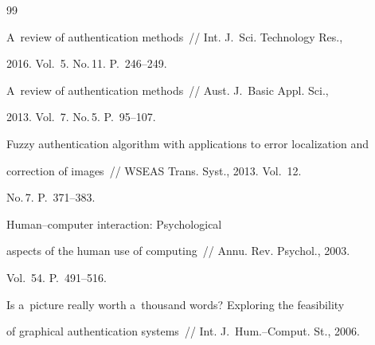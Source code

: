 {\small\frenchspacing


{%




\begin{thebibliography}{99}






 A~review of authentication methods~/\!\!/ Int. J.~Sci. Technology Res., 


 2016. Vol.~5. No.\,11. P.~246--249.









A~review of authentication methods~/\!\!/ {Aust. J.~Basic Appl. Sci.}, 


2013. Vol.~7. No.\,5. P.~95--107.









Fuzzy authentication algorithm with applications to error localization and 


correction of images~/\!\!/ {WSEAS Trans. Syst.}, 2013. Vol.~12. 


No.\,7. P.~371--383.







  Human--computer interaction: Psychological 


aspects of the human use of computing~/\!\!/ {Annu. Rev. Psychol.}, 2003. 


Vol.~54. P.~491--516.















Is a~picture really worth a~thousand words? Exploring the feasibility 


of graphical authentication systems~/\!\!/ {Int. J.~Hum.--Comput. St.}, 2006. 



\end{thebibliography}}}
